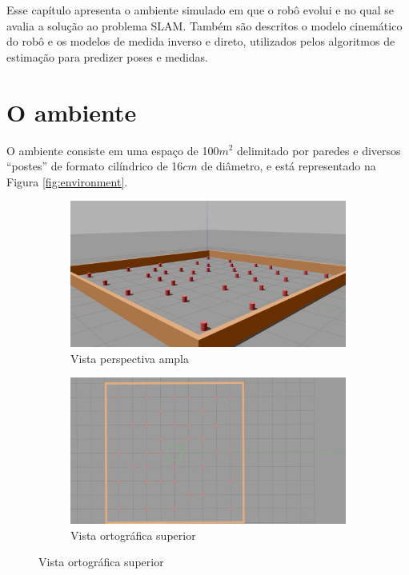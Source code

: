 Esse capítulo apresenta o ambiente simulado em que o robô evolui e no 
qual se avalia a solução ao problema SLAM. Também são descritos o modelo 
cinemático do robô e os modelos de medida inverso e direto, utilizados pelos algoritmos de estimação para predizer poses e medidas.

\section{O ambiente}
O ambiente consiste em uma espaço de 100$m^2$ delimitado por paredes e diversos ``postes'' de formato cilíndrico de 16$cm$ de diâmetro, e está representado na Figura \ref{fig:environment}.
\begin{figure}[h]
  \begin{subfigure}{.50\textwidth}
    \includegraphics[width=\textwidth]{figs/environment-perspective.jpg}
    \caption{Vista perspectiva ampla}
  \end{subfigure}
  \hfill
  \begin{subfigure}{.50\textwidth}
    \includegraphics[width=\textwidth]{figs/environment-birds-eye-of-view.jpg}
    \caption{Vista ortográfica superior}
  \end{subfigure}

\end{figure}
